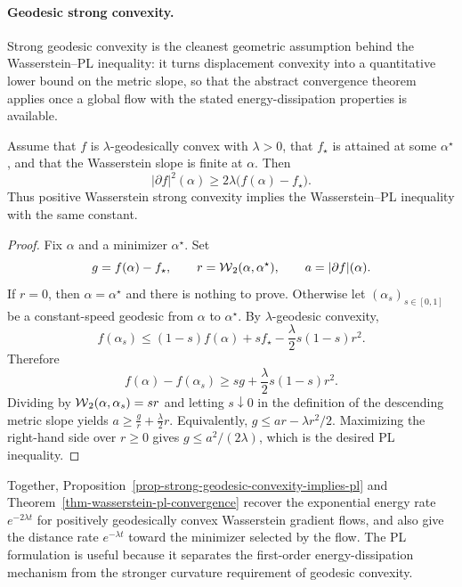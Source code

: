 \paragraph{Geodesic strong convexity.}
Strong geodesic convexity is the cleanest geometric assumption behind the Wasserstein--PL inequality: it turns displacement convexity into a quantitative lower bound on the metric slope, so that the abstract convergence theorem applies once a global flow with the stated energy-dissipation properties is available.

\begin{prop}\label{prop-strong-geodesic-convexity-implies-pl}
	Assume that \(f\) is \(\lambda\)-geodesically convex with \(\lambda>0\), that \(f_\star\) is attained at some \(\alpha^\star\), and that the Wasserstein slope is finite at \(\alpha\). Then
	\[
		|\partial f|^2(\alpha)
		\geq
		2\lambda\bigl(f(\alpha)-f_\star\bigr).
	\]
	Thus positive Wasserstein strong convexity implies the Wasserstein--PL inequality with the same constant.
\end{prop}

\begin{proof}
	Fix \(\alpha\) and a minimizer \(\alpha^\star\). Set
	\[
		g=f(\alpha)-f_\star,\qquad
		r=\operatorname{\mathcal{W}}_2(\alpha,\alpha^\star),\qquad
		a=|\partial f|(\alpha).
	\]
	If \(r=0\), then \(\alpha=\alpha^\star\) and there is nothing to prove. Otherwise let \((\alpha_s)_{s\in[0,1]}\) be a constant-speed geodesic from \(\alpha\) to \(\alpha^\star\). By \(\lambda\)-geodesic convexity,
	\[
		f(\alpha_s)
		\leq
		(1-s)f(\alpha)+s f_\star
		-\frac{\lambda}{2}s(1-s)r^2.
	\]
	Therefore
	\[
		f(\alpha)-f(\alpha_s)
		\geq
		s g+\frac{\lambda}{2}s(1-s)r^2.
	\]
	Dividing by \(\operatorname{\mathcal{W}}_2(\alpha,\alpha_s)=sr\) and letting \(s\downarrow0\) in the definition of the descending metric slope yields
	\(a\geq \frac{g}{r}+\frac{\lambda}{2}r\).
	Equivalently, \(g\leq ar-\lambda r^2/2\). Maximizing the right-hand side over \(r\geq0\) gives \(g\leq a^2/(2\lambda)\), which is the desired PL inequality.
\end{proof}

Together, Proposition~\ref{prop-strong-geodesic-convexity-implies-pl} and Theorem~\ref{thm-wasserstein-pl-convergence} recover the exponential energy rate \(e^{-2\lambda t}\) for positively geodesically convex Wasserstein gradient flows, and also give the distance rate \(e^{-\lambda t}\) toward the minimizer selected by the flow. The PL formulation is useful because it separates the first-order energy-dissipation mechanism from the stronger curvature requirement of geodesic convexity.

